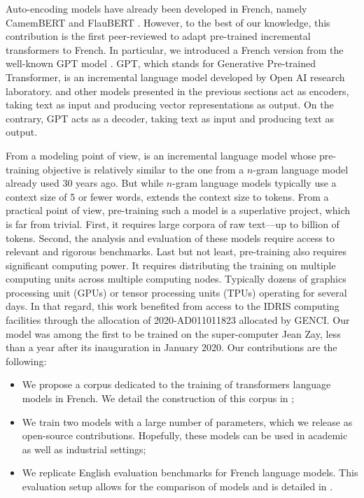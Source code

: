Auto-encoding models have already been developed in French, namely CamemBERT \parencite{martin_20} and FlauBERT \parencite{le_20a, le_20b}. However, to the best of our knowledge, this contribution is the first peer-reviewed to adapt pre-trained incremental transformers to French. In particular, we introduced a French version from the well-known GPT model \parencite{radford_2018, radford_2019, brown_20}. GPT, which stands for Generative Pre-trained Transformer, is an incremental language model developed by Open AI research laboratory. \bert and other models presented in the previous sections act as encoders, taking text as input and producing vector representations as output. On the contrary, GPT acts as a decoder, taking text as input and producing text as output. 

From a modeling point of view, \gpt is an incremental language model whose pre-training objective is relatively similar to the one from a $n$-gram language model already used 30 years ago. But while $n$-gram language models typically use a context size of 5 or fewer words, \gpt extends the context size to  tokens. From a practical point of view, pre-training such a model is a superlative project, which is far from trivial. First, it requires large corpora of raw text—up to billion of tokens. Second, the analysis and evaluation of these models require access to relevant and rigorous benchmarks. Last but not least, pre-training also requires significant computing power. It requires distributing the training on multiple computing units across multiple computing nodes. Typically dozens of graphics processing unit (GPUs) or tensor processing units (TPUs) %
operating for several days. In that regard, this work benefited from access to the IDRIS computing facilities through the allocation of 2020-AD011011823 allocated by GENCI. Our model was among the first to be trained on the super-computer Jean Zay, less than a year after its inauguration in January 2020. Our contributions are the following:
\begin{itemize}
    \item We propose a corpus dedicated to the training of transformers language models in French. We detail the construction of this corpus in ;
    \item We train two models with a large number of parameters, which we release as open-source contributions. Hopefully, these models can be used in academic as well as industrial settings;
    \item We replicate English evaluation benchmarks for French language models. This evaluation setup allows for the comparison of models and is detailed in .
\end{itemize}

